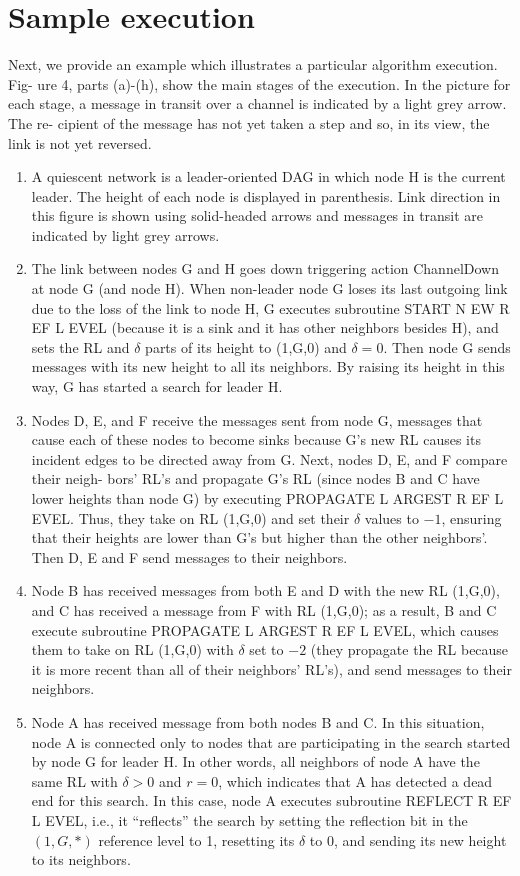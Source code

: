 \section{Sample execution}
Next, we provide an example which illustrates a particular algorithm execution. Fig- ure 4, parts (a)-(h), show the main stages of the execution. In the picture for each stage, a message in transit over a channel is indicated by a light grey arrow. The re- cipient of the message has not yet taken a step and so, in its view, the link is not yet reversed.
\begin{enumerate}[label=\alph*]
	\item A quiescent network is a leader-oriented DAG in which node H is the current leader. The height of each node is displayed in parenthesis. Link direction in this figure is shown using solid-headed arrows and messages in transit are indicated by light grey arrows.
	\item The link between nodes G and H goes down triggering action ChannelDown at node G (and node H). When non-leader node G loses its last outgoing link due to the loss of the link to node H, G executes subroutine START N EW R EF L EVEL (because it is a sink and it has other neighbors besides H), and sets the RL and $\delta$ parts of its height to (1,G,0) and $\delta = 0$. Then node G sends messages with its new height to all its neighbors. By raising its height in this way, G has started a search for leader H.
	\item Nodes D, E, and F receive the messages sent from node G, messages that cause each of these nodes to become sinks because G’s new RL causes its incident edges to be directed away from G. Next, nodes D, E, and F compare their neigh- bors’ RL’s and propagate G’s RL (since nodes B and C have lower heights than node G) by executing PROPAGATE L ARGEST R EF L EVEL. Thus, they take on RL (1,G,0) and set their $\delta$ values to $-1$, ensuring that their heights are lower than G’s but higher than the other neighbors’. Then D, E and F send messages to their neighbors.
	\item Node B has received messages from both E and D with the new RL (1,G,0), and C has received a message from F with RL (1,G,0); as a result, B and C execute subroutine PROPAGATE L ARGEST R EF L EVEL, which causes them to take on RL (1,G,0) with $\delta$ set to $-2$ (they propagate the RL because it is more recent than all of their neighbors’ RL’s), and send messages to their neighbors.
	\item Node A has received message from both nodes B and C. In this situation, node A is connected only to nodes that are participating in the search started by node G for leader H. In other words, all neighbors of node A have the same RL with $\delta > 0$ and $r = 0$, which indicates that A has detected a dead end for this search. In this case, node A executes subroutine REFLECT R EF L EVEL, i.e., it “reflects” the search by setting the reflection bit in the $(1,G,*)$ reference level to 1, resetting its $\delta$ to 0, and sending its new height to its neighbors.

\end{enumerate}
